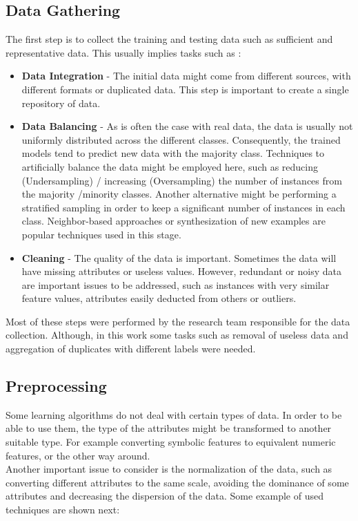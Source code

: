 \subsection{Data Gathering}
The first step is to collect the training and testing data such as sufficient and representative data. This usually implies tasks such as \citep{Gama2015DataMining}:
\begin{itemize}

	\item \textbf{Data Integration} - The initial data might come from different sources, with different formats or duplicated data. This step is important to create a single repository of data. 
    \item \textbf{Data Balancing} - As is often the case with real data, the data is usually not uniformly distributed across the different classes. Consequently, the trained models tend to predict new data with the majority class. Techniques to artificially balance the data might be employed here, such as reducing (Undersampling) / increasing (Oversampling) the number of instances from the majority /minority classes. Another alternative might be performing a stratified sampling in order to keep a significant number of instances in each class. Neighbor-based approaches \citep{mani2003knn,laurikkala2001improving} or synthesization of new examples \citep{chawla2002smote} are popular techniques used in this stage.
    \item \textbf{Cleaning} - The quality of the data is important. Sometimes the data will have missing attributes or useless values. However, redundant or noisy data are important issues to be addressed, such as instances with very similar feature values, attributes easily deducted from others or outliers.
\end{itemize}

Most of these steps were performed by the research team responsible for the data collection. Although, in this work some tasks such as removal of useless data and aggregation of duplicates with different labels were needed.  

\subsection{Preprocessing}
Some learning algorithms do not deal with certain types of data. In order to be able to use them, the type of the attributes might be transformed to another suitable type. For example converting symbolic features to equivalent numeric features, or the other way around. \\ Another important issue to consider is the normalization of the data, such as converting different attributes to the same scale, avoiding the dominance of some attributes and decreasing the dispersion of the data. Some example of used techniques are shown next:

